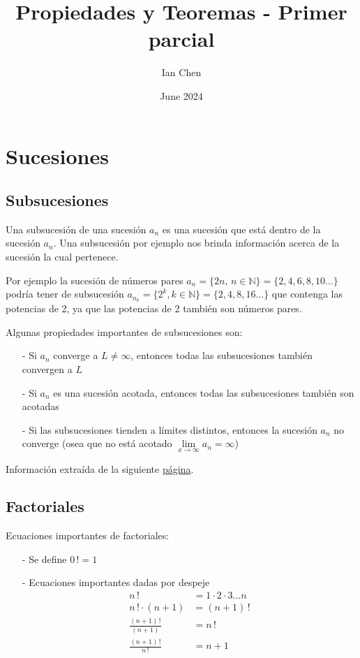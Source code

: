 \documentclass{article}
\title{Propiedades y Teoremas - Primer parcial}
\author{Ian Chen}
\date{June 2024}
\begin{document}
\section{Sucesiones}
\subsection{Subsucesiones}
Una subsucesión de una sucesión $\displaystyle a_n$ es una sucesión que está dentro de la sucesión $a_n$.
Una subsucesión por ejemplo nos brinda información acerca de la sucesión la cual pertenece. 

Por ejemplo la sucesión de números pares $a_n = \{2n ,\, n \in \mathbb{N} \} = \{2, 4, 6, 8, 10 \dots \}$ podría tener de subsucesión $a_{n_k} = \{2^k, k \in \mathbb{N}\} = \{2, 4, 8, 16\dots \}$ que contenga las potencias de 2, ya que las potencias de 2 también son números pares.

Algunas propiedades importantes de subsucesiones son:
\begin{itemize}
    \item[-] Si $a_n$ converge a $L \neq \infty$, entonces todas las subsucesiones también convergen a $L$
    \item[-] Si $a_n$ es una sucesión acotada, entonces todas las subsucesiones también son acotadas
    \item[-] Si las subsucesiones tienden a límites distintos, entonces la sucesión $a_n$ no converge (osea que no está acotado $\displaystyle \lim \limits_{x \to \infty}a_n=\infty$)
\end{itemize}
Información extraída de la siguiente \href{https://www.matesfacil.com/BAC/progresiones/subsucesion-sucesion-parcial-convergente-propiedades-ejemplos-limites-problemas-resueltos.html}{página}.

\vspace{0.5cm}
\subsection{Factoriales}
Ecuaciones importantes de factoriales:
\begin{itemize}
    \item[-] Se define $0\,! = 1$
    \item[-] Ecuaciones importantes dadas por despeje 
    \begin{align*}
        n\,! &= 1 \cdot 2 \cdot 3 \dots n \\[6pt]
        n\,! \cdot (n+1) &= (n+1)\,! \\[6pt]
        \frac{(n+1)\,!}{(n+1)} &= n\,! \\[6pt]
        \frac{(n+1)\,!}{n\,!} &= n+1
    \end{align*}
\end{itemize}
\end{document}
